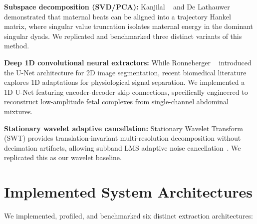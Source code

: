 \documentclass[10pt,twocolumn,letterpaper]{article}
\newcommand{\newcontent}[1]{\textcolor{midtermblue}{#1}}
\begin{document}
\newcontent{\noindent\textbf{Subspace decomposition (SVD/PCA):} Kanjilal \etal~\cite{kanjilal1997} and De Lathauwer \etal~\cite{delathauwer2000} demonstrated that maternal beats can be aligned into a trajectory Hankel matrix, where singular value truncation isolates maternal energy in the dominant singular dyads. We replicated and benchmarked three distinct variants of this method.

\noindent\textbf{Deep 1D convolutional neural extractors:} While Ronneberger \etal~\cite{ronneberger2015} introduced the U-Net architecture for 2D image segmentation, recent biomedical literature explores 1D adaptations for physiological signal separation. We implemented a 1D U-Net featuring encoder-decoder skip connections, specifically engineered to reconstruct low-amplitude fetal complexes from single-channel abdominal mixtures.

\noindent\textbf{Stationary wavelet adaptive cancellation:} Stationary Wavelet Transform (SWT) provides translation-invariant multi-resolution decomposition without decimation artifacts, allowing subband LMS adaptive noise cancellation~\cite{abel2023}. We replicated this as our wavelet baseline.}

\section{Implemented System Architectures}
\label{sec:method}

We implemented, profiled, and benchmarked six distinct extraction architectures:
\end{document}
